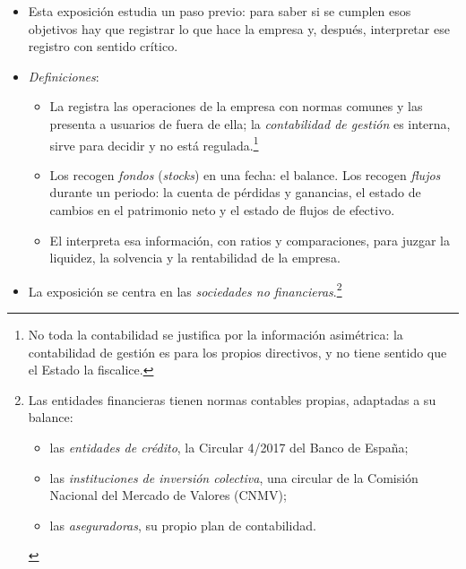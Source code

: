 \documentclass[11pt]{article}
\begin{document}
\begin{itemize}
\begin{itemize}
{Para crear valor, la empresa tiene que cumplir 3~objetivos:
\begin{itemize}
\item \emph{liquidez}: que sus activos generen efectivo a tiempo;
\item \emph{solvencia}: poder hacer frente a todas sus obligaciones;
\item \emph{rentabilidad}: que sus inversiones rindan más de lo que cuesta financiarlas.
\end{itemize}}
  \item Esta exposición estudia un paso previo: para saber si se cumplen esos objetivos hay que registrar lo que hace la empresa y, después, interpretar ese registro con sentido crítico.
  \item \emph{Definiciones}:
    \begin{itemize}
    \item La  registra las operaciones de la empresa con normas comunes y las presenta a usuarios de fuera de ella; la \emph{contabilidad de gestión} es interna, sirve para decidir y no está regulada.\footnote{No toda la contabilidad se justifica por la información asimétrica: la contabilidad de gestión es para los propios directivos, y no tiene sentido que el Estado la fiscalice.}
    \item Los  recogen \emph{fondos} (\emph{stocks}) en una fecha: el balance. Los  recogen \emph{flujos} durante un periodo: la cuenta de pérdidas y ganancias, el estado de cambios en el patrimonio neto y el estado de flujos de efectivo.
    \item El  interpreta esa información, con ratios y comparaciones, para juzgar la liquidez, la solvencia y la rentabilidad de la empresa.
    \end{itemize}
  \item La exposición se centra en las \emph{sociedades no financieras}.\footnote{Las entidades financieras tienen normas contables propias, adaptadas a su balance:
\begin{itemize}
\item las \emph{entidades de crédito}, la Circular 4/2017 del Banco de España\nocite{BdE2017Circular4};
\item las \emph{instituciones de inversión colectiva}, una circular de la Comisión Nacional del Mercado de Valores (CNMV);
\item las \emph{aseguradoras}, su propio plan de contabilidad\nocite{RD1317_2008PCEA}.

\end{itemize}}
\end{itemize}
\end{itemize}
\end{document}

